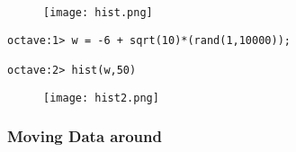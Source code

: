 \documentclass[12pt]{report}
\begin{document}
\begin{figure}[h]
	\texttt{[image: hist.png]}
\end{figure}

\begin{lstlisting}[basicstyle=\small]
octave:1> w = -6 + sqrt(10)*(rand(1,10000));

octave:2> hist(w,50)
\end{lstlisting}

\begin{figure}[h]
	\texttt{[image: hist2.png]}
\end{figure}

\subsubsection{Moving Data around}
\end{document}
